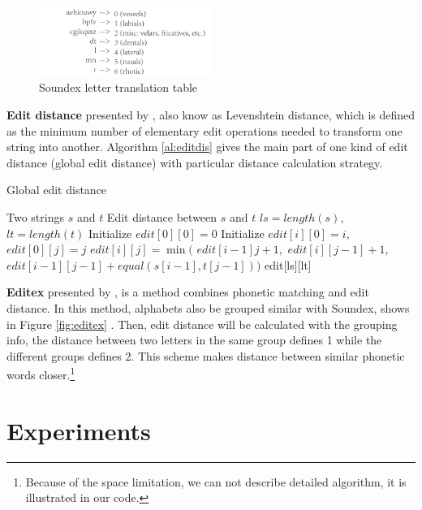 \documentclass[11pt]{article}
\begin{document}
\begin{figure}
	\centering
	\includegraphics[width=0.5\textwidth]{img/soundex.pdf}
	\caption{Soundex letter translation table}
	\label{fig:soundex}
\end{figure}

\noindent\textbf{Edit distance} presented by \cite{Levenshtein1965Binary},  also know as Levenshtein distance, which is defined as the minimum number of elementary edit operations needed to transform one string into another. Algorithm \ref{al:editdis} gives the main part of one kind of edit distance (global edit distance) with particular distance calculation strategy.

\begin{algorithm}[htb]
	\caption{Global edit distance}
	\label{al:editdis}
	\begin{algorithmic}[1]
		\REQUIRE Two strings $s$ and $t$
		\ENSURE Edit distance between $s$ and $t$
		\STATE $ls = length(s)$, $lt = length(t)$
		\STATE Initialize $edit[0][0]=0$
		\STATE Initialize $edit[i][0]=i$, $edit[0][j]=j$
		\STATE $edit[i][j] = \min($
		\STATE $edit[i-1]j+1, $
		\STATE $edit[i][j-1]+1, $
		\STATE $edit[i-1][j-1]+equal(s[i-1],t[j-1]))$
		\ENDFOR
		\ENDFOR
		\RETURN edit[ls][lt]
	\end{algorithmic}
\end{algorithm}


\noindent\textbf{Editex} presented by \cite{Zobel1996PhoneticSM}, is a method combines phonetic matching and edit distance. In this method, alphabets also be grouped similar with Soundex, shows in Figure \ref{fig:editex} . Then, edit distance will be calculated with the grouping info, the distance between two letters in the same group defines 1 while the different groups defines 2. This scheme makes distance between similar phonetic words closer.\footnote{Because of the space limitation, we can not describe detailed algorithm, it is illustrated in our code.}

\section{Experiments}
\end{document}
